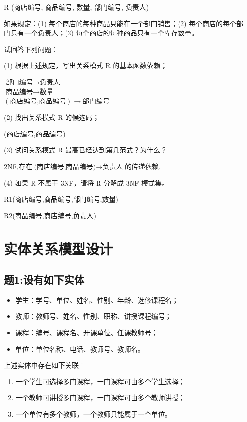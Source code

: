 \documentclass[a4paper,12pt,UTF8,fontset=none]{ctexart}
\begin{document}
   R (商店编号, 商品编号, 数量, 部门编号, 负责人)

   如果规定：(1) 每个商店的每种商品只能在一个部门销售；(2) 每个商店的每个部门只有一个负责人；(3) 每个商店的每种商品只有一个库存数量。

   试回答下列问题：

   (1) 根据上述规定，写出关系模式 R 的基本函数依赖；
   \begin{center}
   $\text{部门编号} \rightarrow \text{负责人}$\\
   $\text{商品编号} \rightarrow \text{数量}$\\
   $(\text{商店编号,商品编号}) \rightarrow \text{部门编号}$\\
   \end{center}

   (2) 找出关系模式 R 的候选码；
   \par (商店编号,商品编号)

   (3) 试问关系模式 R 最高已经达到第几范式？为什么？
   \par 2NF,存在$\mbox{(商店编号,商品编号)} \rightarrow \mbox{负责人}$的传递依赖.

   (4) 如果 R 不属于 3NF，请将 R 分解成 3NF 模式集。
   \par R1(商店编号,商品编号,部门编号,数量)

   R2(商品编号,商店编号,负责人)
\section{实体关系模型设计}

   \subsection*{题1:设有如下实体}
   \begin{itemize}
    \item 学生：学号、单位、姓名、性别、年龄、选修课程名；
    \item 教师：教师号、姓名、性别、职称、讲授课程编号；
    \item 课程：编号、课程名、开课单位、任课教师号；
    \item 单位：单位名称、电话、教师号、教师名。
\end{itemize}
   上述实体中存在如下关联：
   
   \begin{enumerate}
       \item 一个学生可选择多门课程，一门课程可由多个学生选择；
       \item 一个教师可讲授多门课程，一门课程可由多个教师讲授；
       \item 一个单位有多个教师，一个教师只能属于一个单位。
   \end{enumerate}
   
\end{document}
